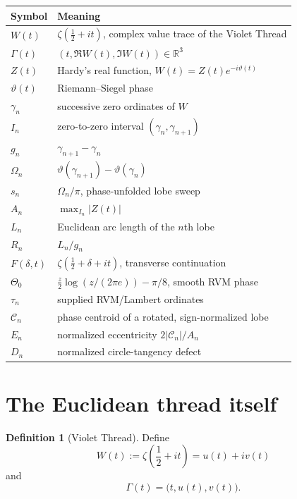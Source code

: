 \documentclass[11pt]{article}
\theoremstyle{definition}
\newtheorem{definition}[theorem]{Definition}
\newcommand{\R}{\mathbb R}
\begin{document}
\begin{center}
\begin{tabular}{>{\raggedright\arraybackslash}p{}p{}}
\toprule
Symbol & Meaning \\
\midrule
$W(t)$ & $\zeta(\tfrac12+it)$, complex value trace of the Violet Thread \\
$\Gamma(t)$ & $(t,\Re W(t),\Im W(t))\in\R^3$ \\
$Z(t)$ & Hardy's real function, $W(t)=Z(t)e^{-i\vartheta(t)}$ \\
$\vartheta(t)$ & Riemann--Siegel phase \\
$\gamma_n$ & successive zero ordinates of $W$ \\
$I_n$ & zero-to-zero interval $(\gamma_n,\gamma_{n+1})$ \\
$g_n$ & $\gamma_{n+1}-\gamma_n$ \\
$\Omega_n$ & $\vartheta(\gamma_{n+1})-\vartheta(\gamma_n)$ \\
$s_n$ & $\Omega_n/\pi$, phase-unfolded lobe sweep \\
$A_n$ & $\max_{I_n}|Z(t)|$ \\
$L_n$ & Euclidean arc length of the $n$th lobe \\
$R_n$ & $L_n/g_n$ \\
$F(\delta,t)$ & $\zeta(\tfrac12+\delta+it)$, transverse continuation \\
$\Theta_0$ & $\frac z2\log(z/(2\pi e))-\pi/8$, smooth RVM phase \\
$\tau_n$ & supplied RVM/Lambert ordinates \\
$\mathcal C_n$ & phase centroid of a rotated, sign-normalized lobe \\
$E_n$ & normalized eccentricity $2|\mathcal C_n|/A_n$ \\
$D_n$ & normalized circle-tangency defect \\
\bottomrule
\end{tabular}
\end{center}

\section{The Euclidean thread itself}

\begin{definition}[Violet Thread]
Define
\[
\boxed{
W(t):=\zeta\!\left(\frac12+it\right)=u(t)+iv(t)
}
\]
and
\[
\boxed{
\Gamma(t)=\bigl(t,u(t),v(t)\bigr).
}
\]
\end{definition}
\end{document}
